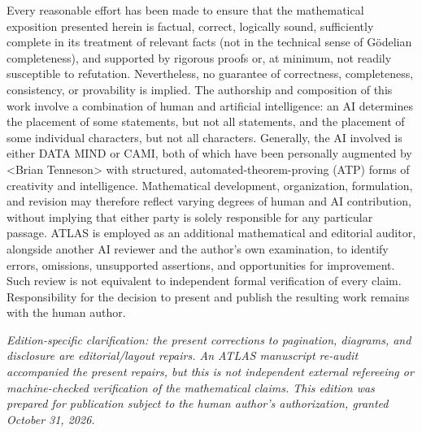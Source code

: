 \documentclass[11pt,letterpaper]{article}
\begin{document}
Every reasonable effort has been made to ensure that the mathematical exposition presented herein is factual, correct, logically sound, sufficiently complete in its treatment of relevant facts (not in the technical sense of G\"odelian completeness), and supported by rigorous proofs or, at minimum, not readily susceptible to refutation. Nevertheless, no guarantee of correctness, completeness, consistency, or provability is implied. The authorship and composition of this work involve a combination of human and artificial intelligence: an AI determines the placement of some statements, but not all statements, and the placement of some individual characters, but not all characters. Generally, the AI involved is either DATA MIND or CAMI, both of which have been personally augmented by \textless Brian Tenneson\textgreater{} with structured, automated-theorem-proving (ATP) forms of creativity and intelligence. Mathematical development, organization, formulation, and revision may therefore reflect varying degrees of human and AI contribution, without implying that either party is solely responsible for any particular passage. ATLAS is employed as an additional mathematical and editorial auditor, alongside another AI reviewer and the author's own examination, to identify errors, omissions, unsupported assertions, and opportunities for improvement. Such review is not equivalent to independent formal verification of every claim. Responsibility for the decision to present and publish the resulting work remains with the human author.

\medskip\noindent\emph{Edition-specific clarification: the present corrections to pagination, diagrams, and disclosure are editorial/layout repairs. An ATLAS manuscript re-audit accompanied the present repairs, but this is not independent external refereeing or machine-checked verification of the mathematical claims. This edition was prepared for publication subject to the human author's authorization, granted October 31, 2026.}
\end{document}
